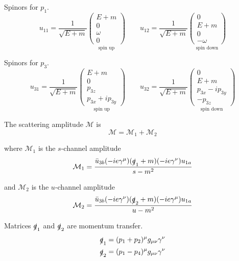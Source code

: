 Spinors for $p_1$.
\begin{equation*}
u_{11}=\frac{1}{\sqrt{E+m}}
\underset{\text{spin up}}
{\begin{pmatrix}
E+m\\
0\\
\omega\\
0
\end{pmatrix}}
\qquad
u_{12}=\frac{1}{\sqrt{E+m}}
\underset{\text{spin down}}
{\begin{pmatrix}
0\\
E+m\\
0\\
-\omega
\end{pmatrix}}
\end{equation*}

Spinors for $p_3$.
\begin{equation*}
u_{31}=\frac{1}{\sqrt{E+m}}
\underset{\text{spin up}}
{\begin{pmatrix}
E+m\\
0\\
p_{3z}\\
p_{3x}+ip_{3y}
\end{pmatrix}}
\qquad
u_{32}=\frac{1}{\sqrt{E+m}}
\underset{\text{spin down}}
{\begin{pmatrix}
0\\
E+m\\
p_{3x}-ip_{3y}\\
-p_{3z}
\end{pmatrix}}
\end{equation*}

The scattering amplitude $\mathcal M$ is
\begin{equation*}
\mathcal M=\mathcal M_1+\mathcal M_2
\end{equation*}

where $\mathcal M_1$ is the $s$-channel amplitude
\begin{equation*}
\mathcal M_1=\frac{\bar{u}_{3b}(-ie\gamma^\mu)(\slashed{q}_1+m)(-ie\gamma^\nu)u_{1a}}{s-m^2}
\end{equation*}

and $\mathcal M_2$ is the $u$-channel amplitude
\begin{equation*}
\mathcal M_2=\frac{\bar{u}_{3b}(-ie\gamma^\nu)(\slashed{q}_2+m)(-ie\gamma^\mu)u_{1a}}{u-m^2}
\end{equation*}

Matrices $\slashed q_1$ and $\slashed q_2$ are momentum transfer.
\begin{align*}
\slashed q_1&=(p_1+p_2)^\mu g_{\mu\nu}\gamma^\nu
\\
\slashed q_2&=(p_1-p_4)^\mu g_{\mu\nu}\gamma^\nu
\end{align*}

